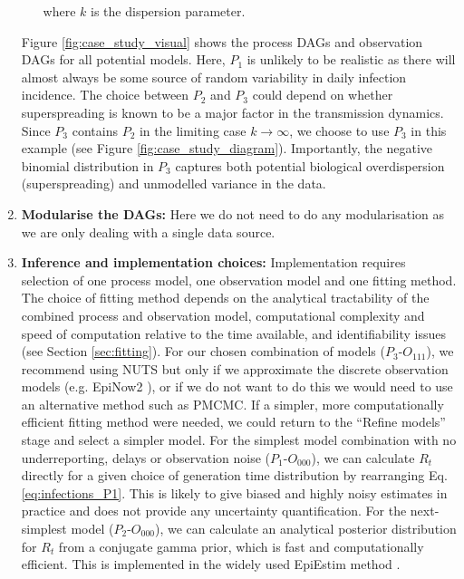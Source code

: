 \documentclass{article}
\begin{document}
\begin{enumerate}
\begin{itemize}
    where $k$ is the dispersion parameter. 
    \end{itemize} 
Figure \ref{fig:case_study_visual} shows the process DAGs and observation DAGs for all potential models. Here, $P_1$ is unlikely to be realistic as there will almost always be some source of random variability in daily infection incidence. The choice between $P_2$ and $P_3$ could depend on whether superspreading is known to be a major factor in the transmission dynamics. Since $P_3$ contains $P_2$ in the limiting case $k\to\infty$, we choose to use $P_3$ in this example (see Figure \ref{fig:case_study_diagram}).
Importantly, the negative binomial distribution in $P_3$ captures both potential biological overdispersion (superspreading) and unmodelled variance in the data. 


\item \textbf{Modularise the DAGs:} Here we do not need to do any modularisation as we are only dealing with a single data source.

\item \textbf{Inference and implementation choices:} Implementation requires selection of one process model, one observation model and one fitting method. The choice of fitting method depends on the analytical tractability of the combined process and observation model, computational complexity and speed of computation relative to the time available, and identifiability issues (see Section \ref{sec:fitting}). 
For our chosen combination of models ($P_3$-$O_{111}$), we recommend using NUTS but only if we approximate the discrete observation models (e.g. EpiNow2 \citep{abbott2020estimating}), or if we do not want to do this we would need to use an alternative method such as PMCMC. If a simpler, more computationally efficient fitting method were needed, we could return to the ``Refine models'' stage and select a simpler model. For the simplest model combination with no underreporting, delays or observation noise ($P_1$-$O_{000}$), we can calculate $R_t$ directly for a given choice of generation time distribution by rearranging Eq. \eqref{eq:infections_P1}. This is likely to give biased and highly noisy estimates in practice and does not provide any uncertainty quantification. For the next-simplest model ($P_2$-$O_{000}$), we can calculate an analytical posterior distribution for $R_t$  from a conjugate gamma prior, which is fast and computationally efficient. This is implemented in the widely used EpiEstim method \citep{cori2013new}. 


\end{enumerate}
\end{document}

